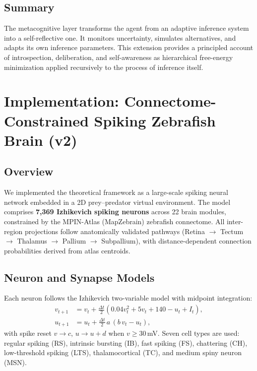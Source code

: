 \documentclass[9pt]{elife}
\begin{document}
\subsection{Summary}

The metacognitive layer transforms the agent
from an adaptive inference system into a self-reflective one.
It monitors uncertainty, simulates alternatives,
and adapts its own inference parameters.
This extension provides a principled account of introspection,
deliberation, and self-awareness as hierarchical free-energy minimization
applied recursively to the process of inference itself.


\section{Implementation: Connectome-Constrained Spiking Zebrafish Brain (v2)}

\subsection{Overview}

We implemented the theoretical framework as a large-scale spiking neural network
embedded in a 2D prey--predator virtual environment.
The model comprises \textbf{7,369 Izhikevich spiking neurons} across 22 brain modules,
constrained by the MPIN-Atlas (MapZebrain) zebrafish connectome.
All inter-region projections follow anatomically validated pathways
(Retina $\to$ Tectum $\to$ Thalamus $\to$ Pallium $\to$ Subpallium),
with distance-dependent connection probabilities derived from atlas centroids.

\subsection{Neuron and Synapse Models}

Each neuron follows the Izhikevich two-variable model with midpoint integration:
\begin{align}
v_{t+1} &= v_t + \frac{\Delta t}{2}\left(0.04v_t^2 + 5v_t + 140 - u_t + I_t\right), \\
u_{t+1} &= u_t + \frac{\Delta t}{2}\,a\,(b\,v_t - u_t),
\end{align}
with spike reset $v \to c$, $u \to u + d$ when $v \geq 30$\,mV.
Seven cell types are used: regular spiking (RS), intrinsic bursting (IB),
fast spiking (FS), chattering (CH), low-threshold spiking (LTS),
thalamocortical (TC), and medium spiny neuron (MSN).
\end{document}
